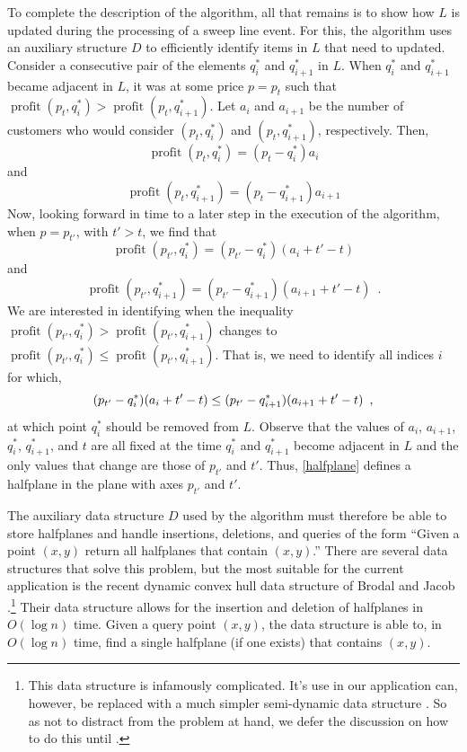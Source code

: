 \documentclass[lotsofwhite]{patmorin}
\newcommand{\val}{\operatorname{profit}}
\begin{document}
To complete the description of the algorithm, all that remains is to
show how $L$ is updated during the processing of a sweep line event.
For this, the algorithm uses an auxiliary structure $D$ to efficiently
identify items in $L$ that need to updated.  Consider a consecutive
pair of the elements $q^*_i$ and $q^*_{i+1}$ in $L$.  When $q^*_i$ and
$q^*_{i+1}$ became adjacent in $L$, it was at some price $p=p_t$ such
that $\val(p_t,q^*_i)>\val(p_t,q^*_{i+1})$.  Let $a_i$ and $a_{i+1}$
be the number of customers who would consider $(p_t,q^*_i)$ and
$(p_t,q^*_{i+1})$, respectively. Then,
\[
  \val(p_t,q^*_i) = (p_t-q^*_i)a_i
\]
and
\[
  \val(p_t,q^*_{i+1}) = (p_t-q^*_{i+1})a_{i+1}
\]
Now, looking forward in time to a later step in the execution of
the algorithm, when $p=p_{t'}$, with $t'> t$, we find that
\[
  \val(p_{t'},q^*_i) = (p_{t'}-q^*_i)(a_i+t'-t)
\]
and
\[
  \val(p_{t'},q^*_{i+1}) = (p_{t'}-q^*_{i+1})(a_{i+1}+t'-t) \enspace .
\]
We are interested in identifying when the inequality
$\val(p_{t'},q^*_i) > \val(p_{t'},q^*_{i+1})$ changes to 
$\val(p_{t'},q^*_i) \le \val(p_{t'},q^*_{i+1})$.  That is, we need to
identify all indices $i$ for which, 
\begin{equation}
  (p_{t'}-q^*_i)(a_i+t'-t) \le (p_{t'}-q^*_{i+1})(a_{i+1}+t'-t)  \enspace ,
    \eqlabel{halfplane}
\end{equation}
at which point $q^*_i$ should be removed from $L$.  Observe that
the values of $a_i$, $a_{i+1}$, $q^*_i$, $q^*_{i+1}$, and $t$ are all
fixed at the time $q^*_i$ and $q^*_{i+1}$ become adjacent in $L$ and
the only values that change are those of $p_{t'}$ and $t'$.  Thus,
\eqref{halfplane} defines a halfplane in the plane with axes
$p_{t'}$ and $t'$.

The auxiliary data structure $D$ used by the algorithm must therefore be
able to store halfplanes and handle insertions, deletions, and queries
of the form ``Given a point $(x,y)$ return all halfplanes that contain
$(x,y)$.'' There are several data structures that solve this problem,
but the most suitable for the current application is the recent dynamic
convex hull data structure of Brodal and Jacob \cite{bj02}.\footnote{This
data structure is infamously complicated.  It's use in our application
can, however, be replaced with a much simpler semi-dynamic data structure
\cite{ds91}.  So as not to distract from the problem at hand, we defer
the discussion on how to do this until .}  Their
data structure allows for the insertion and deletion of halfplanes in
$O(\log n)$ time.  Given a query point $(x,y)$, the data structure is
able to, in $O(\log n)$ time, find a single halfplane (if one exists)
that contains $(x,y)$.
\end{document}
